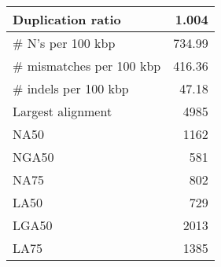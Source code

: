 \documentclass[12pt,a4paper]{article}
\begin{document}
\begin{table}[ht]
\begin{center}
\begin{tabular}{|l*{1}{|r}|}
Duplication ratio & 1.004 \\ \hline
\# N's per 100 kbp & 734.99 \\ \hline
\# mismatches per 100 kbp & 416.36 \\ \hline
\# indels per 100 kbp & 47.18 \\ \hline
Largest alignment & 4985 \\ \hline
NA50 & 1162 \\ \hline
NGA50 & 581 \\ \hline
NA75 & 802 \\ \hline
LA50 & 729 \\ \hline
LGA50 & 2013 \\ \hline
LA75 & 1385 \\ \hline
\end{tabular}
\end{center}
\end{table}
\end{document}

